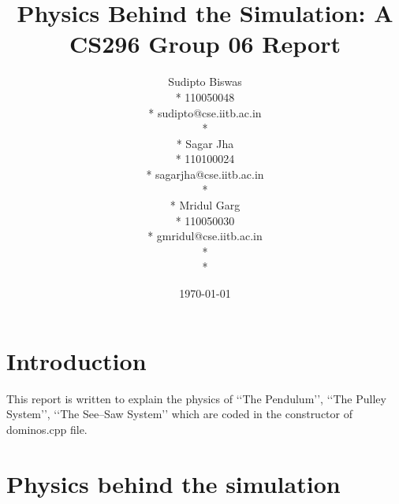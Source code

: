 \documentclass[11pt]{article}
\begin{document}
\title{Physics Behind the Simulation: A CS296 Group 06 Report}
\author{ Sudipto Biswas \\*
110050048\\*
sudipto@cse.iitb.ac.in\\*\\*
Sagar Jha\\*
110100024\\*
sagarjha@cse.iitb.ac.in\\*\\*
Mridul Garg\\*
110050030\\*
gmridul@cse.iitb.ac.in\\*\\*
}
\date{\today}
\maketitle

\section{Introduction}
This report is written to explain the physics of \lq\lq The Pendulum\rq\rq{}, \lq\lq The Pulley System\rq\rq{}, \lq\lq The See--Saw System\rq\rq{} which are coded in the constructor of dominos.cpp file.

\section{Physics behind the simulation}
\end{document}
